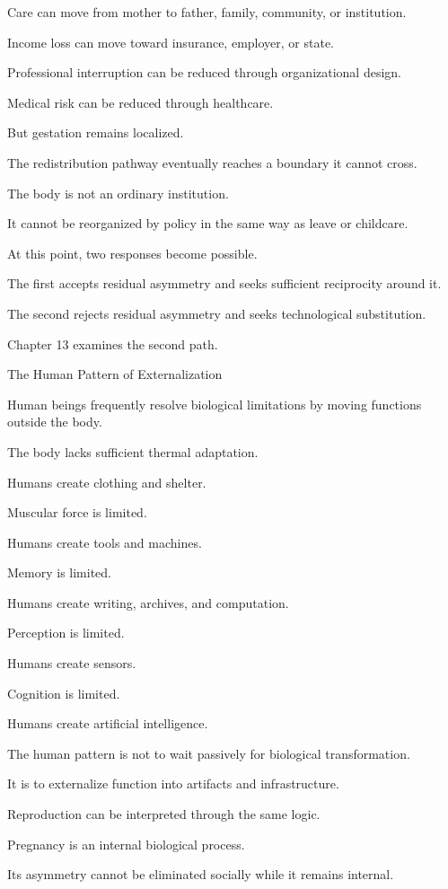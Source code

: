 Care can move from mother to father, family, community, or institution.

Income loss can move toward insurance, employer, or state.

Professional interruption can be reduced through organizational design.

Medical risk can be reduced through healthcare.

But gestation remains localized.

The redistribution pathway eventually reaches a boundary it cannot cross.

The body is not an ordinary institution.

It cannot be reorganized by policy in the same way as leave or childcare.

At this point, two responses become possible.

The first accepts residual asymmetry and seeks sufficient reciprocity around it.

The second rejects residual asymmetry and seeks technological substitution.

Chapter 13 examines the second path.

The Human Pattern of Externalization

Human beings frequently resolve biological limitations by moving functions outside the body.

The body lacks sufficient thermal adaptation.

Humans create clothing and shelter.

Muscular force is limited.

Humans create tools and machines.

Memory is limited.

Humans create writing, archives, and computation.

Perception is limited.

Humans create sensors.

Cognition is limited.

Humans create artificial intelligence.

The human pattern is not to wait passively for biological transformation.

It is to externalize function into artifacts and infrastructure.

Reproduction can be interpreted through the same logic.

Pregnancy is an internal biological process.

Its asymmetry cannot be eliminated socially while it remains internal.

